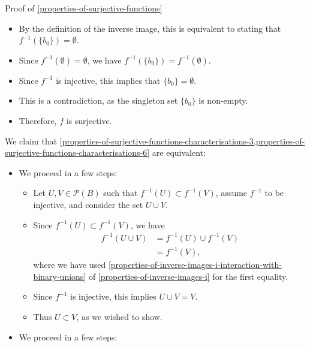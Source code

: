 \begin{Proof}{Proof of \cref{properties-of-surjective-functions}}
\begin{itemize}
\begin{itemize}
                \item By the definition of the inverse image, this is equivalent to stating that $f^{-1}(\{b_{0}\})=\emptyset$.
                \item Since $f^{-1}(\emptyset)=\emptyset$, we have $f^{-1}(\{b_{0}\})=f^{-1}(\emptyset)$.
                \item Since $f^{-1}$ is injective, this implies that $\{b_{0}\}=\emptyset$.
                \item This is a contradiction, as the singleton set $\{b_{0}\}$ is non-empty.
                \item Therefore, $f$ is surjective.
            \end{itemize}
    \end{itemize}

    We claim that \cref{properties-of-surjective-functions-characterisations-3,properties-of-surjective-functions-characterisations-6} are equivalent:
    \begin{itemize}
        \item{}We proceed in a few steps:
            \begin{itemize}
                \item Let $U,V\in\mathcal{P}(B)$ such that $f^{-1}(U)\subset f^{-1}(V)$, assume $f^{-1}$ to be injective, and consider the set $U\cup V$.
                \item Since $f^{-1}(U)\subset f^{-1}(V)$, we have
                    \begin{align*}
                        f^{-1}(U\cup V) &= f^{-1}(U)\cup f^{-1}(V)\\
                                        &= f^{-1}(V),
                    \end{align*}
                    where we have used \cref{properties-of-inverse-images-i-interaction-with-binary-unions} of \cref{properties-of-inverse-images-i} for the first equality.
                \item Since $f^{-1}$ is injective, this implies $U\cup V=V$.
                \item Thus $U\subset V$, as we wished to show.
            \end{itemize}
        \item{}We proceed in a few steps:

\end{itemize}
\end{Proof}
